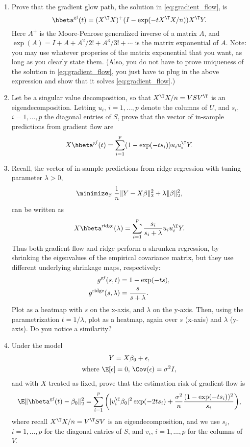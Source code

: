 \documentclass{article}
\begin{document}
\begin{enumerate}[label=(\alph*)]
\item Prove that the gradient glow path, the solution in
  \eqref{eq:gradient_flow}, is 
 \marginpar{\small [4 pts]}
  \[
  \hbeta^\gf(t) = (X^\T X)^+ (I - \exp(-t X^\T X/n)) X^\T Y.
  \]
  Here $A^+$ is the Moore-Penrose generalized inverse of a matrix $A$, and
  $\exp(A) = I + A + A^2/2! + A^3/3! + \cdots$ is the matrix exponential of
  $A$. Note: you may use whatever properies of the matrix exponential that you
  want, as long as you clearly state them. (Also, you do not have to prove
  uniqueness of the solution in \eqref{eq:gradient_flow}, you just have to plug
  in the above expression and show that it solves \eqref{eq:gradient_flow}.) 

\item Let  be a singular value
  decomposition, so that $X^\T X / n = V S V^\T$ is an
  eigendecomposition. Letting $u_i$, $i=1,\dots,p$ denote the columns of $U$, 
  and $s_i$, $i=1,\dots,p$ the diagonal entries of $S$, prove that the vector of
  in-sample predictions from gradient flow are   
 \marginpar{\small [4 pts]}
  \[
  X \hbeta^\gf(t) = \sum_{i=1}^p (1 - \exp(-ts_i)) u_i u_i^\T Y.
  \]
 
\item Recall, the vector of in-sample predictions from ridge regression with
  tuning parameter $\lambda>0$,
  \[
  \minimize_\beta \; \frac{1}{n} \|Y - X\beta\|_2^2 + \lambda \|\beta\|_2^2,  
  \]
 can be written as 
  \[
  X \hbeta^\ridge(\lambda) = \sum_{i=1}^p \frac{s_i}{s_i + \lambda} u_i u_i^\T
  Y. 
  \]
  Thus both gradient flow and ridge perform a shrunken regression, by shrinking
  the eigenvalues of the empirical covariance matrix, but they use different
  underlying shrinkage maps, respectively:
  \begin{align*}
  g^{\mathrm{gf}}(s,t) &= 1 - \exp(-ts), \\
  g^{\mathrm{ridge}}(s,\lambda) &= \frac{s}{s + \lambda}.
  \end{align*}
  Plot  as a heatmap with $s$ on the x-axis, and $\lambda$ on
  the y-axis. Then, using the parametrization $t = 1/\lambda$, plot 
   as a heatmap, again over $s$ (x-axis) and $\lambda$
  (y-axis). Do you notice a similarity?     
  \marginpar{\small [4 pts]}

\item Under the model 
  \begin{gather*}
  Y = X\beta_0 + \epsilon, \\ \text{where $\E[\epsilon] = 0$, $\Cov(\epsilon) =
    \sigma^2 I$}, 
  \end{gather*}
  and with $X$ treated as fixed, prove that the estimation risk of gradient flow
  is  
  \marginpar{\small [8 pts]}
  \[
  \E \|\hbeta^\gf(t) - \beta_0\|_2^2 = \sum_{i=1}^p \bigg(|v_i^\T \beta_0|^2 
  \exp(-2 t s_i) +  \frac{\sigma^2}{n} \frac{(1 - \exp(-t s_i))^2}{s_i} \bigg), 
  \]
  where recall $X^\T X/n = V^\T S V$ is an eigendecomposition, and we use $s_i$,
  $i=1,\dots,p$ for the diagonal entries of $S$, and $v_i$, $i=1,\dots,p$ for
  the columns of $V$. 


\end{enumerate}
\end{document}
